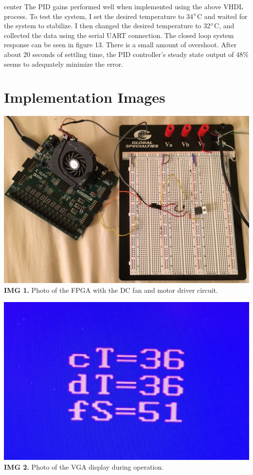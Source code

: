 \documentclass{article}
\begin{document}
{center}
The PID gains performed well when implemented using the above VHDL process. To test the system, I set the desired temperature to 34$\degree$C and waited for the system to stabilize. I then changed the desired temperature to 32$\degree$C, and collected the data using the serial UART connection. The closed loop system response can be seen in figure 13. There is a small amount of overshoot. After about 20 seconds of settling time, the PID controller's steady state output of 48\% seems to adequately minimize the error.

\section{Implementation Images}
\begin{center}
\includegraphics[scale=.2]{images/hardware}\\
\textbf{IMG 1.} Photo of the FPGA with the DC fan and motor driver circuit.\\
\end{center}
\begin{center}
\includegraphics[scale=.2]{images/vgaScreen}\\
\textbf{IMG 2.} Photo of the VGA display during operation.\\
\end{center}
\end{document}
